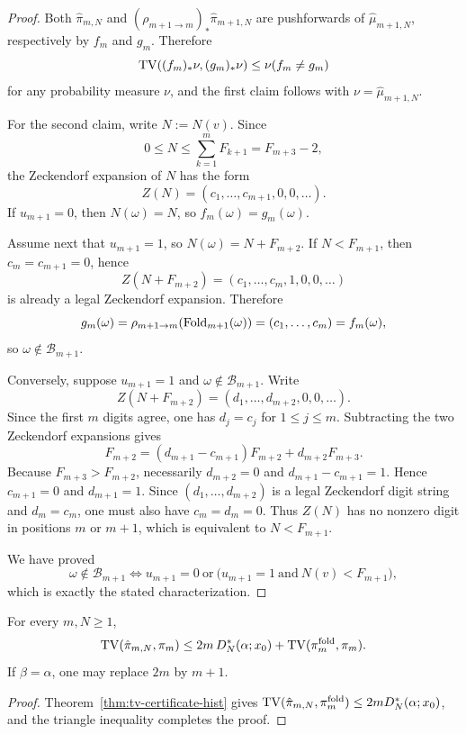 \begin{proof}
Both $\hat\pi_{m,N}$ and $(\rho_{m+1\to m})_*\hat\pi_{m+1,N}$ are pushforwards
of $\hat\mu_{m+1,N}$, respectively by $f_m$ and $g_m$.  Therefore
\[
\operatorname{TV}((f_m)_*\nu,(g_m)_*\nu)\le \nu(f_m\neq g_m)
\]
for any probability measure $\nu$, and the first claim follows with
$\nu=\hat\mu_{m+1,N}$.

For the second claim, write \(N:=N(v)\). Since
\[
0\le N\le \sum_{k=1}^m F_{k+1}=F_{m+3}-2,
\]
the Zeckendorf expansion of \(N\) has the form
\[
Z(N)=(c_1,\dots,c_{m+1},0,0,\dots).
\]
If \(u_{m+1}=0\), then \(N(\omega)=N\), so \(f_m(\omega)=g_m(\omega)\).

Assume next that \(u_{m+1}=1\), so \(N(\omega)=N+F_{m+2}\). If \(N<F_{m+1}\),
then \(c_m=c_{m+1}=0\), hence
\[
Z(N+F_{m+2})=(c_1,\dots,c_m,1,0,0,\dots)
\]
is already a legal Zeckendorf expansion. Therefore
\[
g_m(\omega)=\rho_{m+1\to m}(\mathrm{Fold}_{m+1}(\omega))=(c_1,\dots,c_m)=f_m(\omega),
\]
so \(\omega\notin\mathcal{B}_{m+1}\).

Conversely, suppose \(u_{m+1}=1\) and \(\omega\notin\mathcal{B}_{m+1}\). Write
\[
Z(N+F_{m+2})=(d_1,\dots,d_{m+2},0,0,\dots).
\]
Since the first \(m\) digits agree, one has \(d_j=c_j\) for \(1\le j\le m\).
Subtracting the two Zeckendorf expansions gives
\[
F_{m+2}
=
(d_{m+1}-c_{m+1})F_{m+2}+d_{m+2}F_{m+3}.
\]
Because \(F_{m+3}>F_{m+2}\), necessarily \(d_{m+2}=0\) and
\(d_{m+1}-c_{m+1}=1\). Hence \(c_{m+1}=0\) and \(d_{m+1}=1\). Since
\((d_1,\dots,d_{m+2})\) is a legal Zeckendorf digit string and \(d_m=c_m\), one
must also have \(c_m=d_m=0\). Thus \(Z(N)\) has no nonzero digit in positions
\(m\) or \(m+1\), which is equivalent to \(N<F_{m+1}\).

We have proved
\[
\omega\notin\mathcal{B}_{m+1}
\iff
u_{m+1}=0\ \text{or}\ \bigl(u_{m+1}=1\ \text{and}\ N(v)<F_{m+1}\bigr),
\]
which is exactly the stated characterization.
\end{proof}

\begin{corollary}\label{cor:tv-decomposition-parry}
For every $m,N\ge 1$,
\[
\operatorname{TV}(\hat\pi_{m,N},\pi_m)
\le
2m\,D_N^*(\alpha;x_0)+\operatorname{TV}(\pi_m^{\mathrm{fold}},\pi_m).
\]
If \(\beta=\alpha\), one may replace \(2m\) by \(m+1\).
\end{corollary}

\begin{proof}
Theorem~\ref{thm:tv-certificate-hist} gives
$\operatorname{TV}(\hat\pi_{m,N},\pi_m^{\mathrm{fold}})\le 2mD_N^*(\alpha;x_0)$, and the
triangle inequality completes the proof.
\end{proof}

